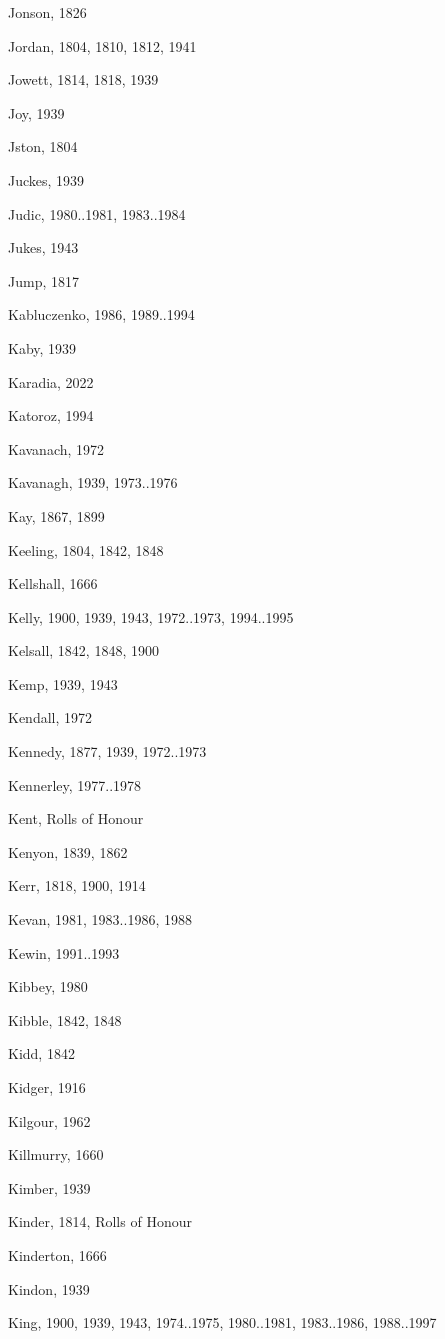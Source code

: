 \begin{theindex}
\item Jonson, 1826
\item Jordan, 1804, 1810, 1812, 1941
\item Jowett, 1814, 1818, 1939
\item Joy, 1939
\item Jston, 1804
\item Juckes, 1939
\item Judic, 1980..1981, 1983..1984
\item Jukes, 1943
\item Jump, 1817
\item Kabluczenko, 1986, 1989..1994
\item Kaby, 1939
\item Karadia, 2022
\item Katoroz, 1994
\item Kavanach, 1972
\item Kavanagh, 1939, 1973..1976
\item Kay, 1867, 1899
\item Keeling, 1804, 1842, 1848
\item Kellshall, 1666
\item Kelly, 1900, 1939, 1943, 1972..1973, 1994..1995
\item Kelsall, 1842, 1848, 1900
\item Kemp, 1939, 1943
\item Kendall, 1972
\item Kennedy, 1877, 1939, 1972..1973
\item Kennerley, 1977..1978
\item Kent, Rolls of Honour
\item Kenyon, 1839, 1862
\item Kerr, 1818, 1900, 1914
\item Kevan, 1981, 1983..1986, 1988
\item Kewin, 1991..1993
\item Kibbey, 1980
\item Kibble, 1842, 1848
\item Kidd, 1842
\item Kidger, 1916
\item Kilgour, 1962
\item Killmurry, 1660
\item Kimber, 1939
\item Kinder, 1814, Rolls of Honour
\item Kinderton, 1666
\item Kindon, 1939
\item King, 1900, 1939, 1943, 1974..1975, 1980..1981, 1983..1986, 1988..1997

\end{theindex}
